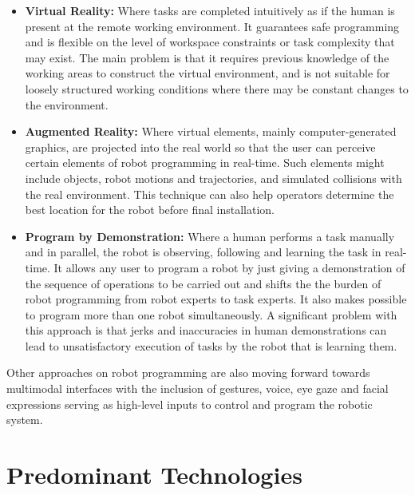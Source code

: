 \begin{itemize}
    \item \textbf{Virtual Reality: }Where tasks are completed intuitively as if the human is present at the remote working environment. It guarantees safe programming and is flexible on the level of workspace constraints or task complexity that may exist. The main problem is that it requires previous knowledge of the working areas to construct the virtual environment, and is not suitable for loosely structured working conditions where there may be constant changes to the environment.
    \item \textbf{Augmented Reality: }Where virtual elements, mainly computer-generated graphics, are projected into the real world so that the user can perceive certain elements of robot programming in real-time. Such elements might include objects, robot motions and trajectories, and  simulated collisions with the real environment. This technique can also help operators determine the best location for the robot before final installation.
    \item \textbf{Program by Demonstration: }Where a human performs a task manually and in parallel, the robot is observing, following and learning the task in real-time. It allows any user to program a robot by just giving a demonstration of the sequence of operations to be carried out and shifts the the burden of robot programming from robot experts to task experts. It also makes possible to program more than one robot simultaneously. A significant problem with this approach is that jerks and inaccuracies in human demonstrations can lead to unsatisfactory execution of tasks by the robot that is learning them.
\end{itemize}


\par Other approaches on robot programming are also moving forward towards multimodal interfaces with the inclusion of gestures, voice, eye gaze and facial expressions serving as high-level inputs to control and program the robotic system.





\section{Predominant Technologies}

